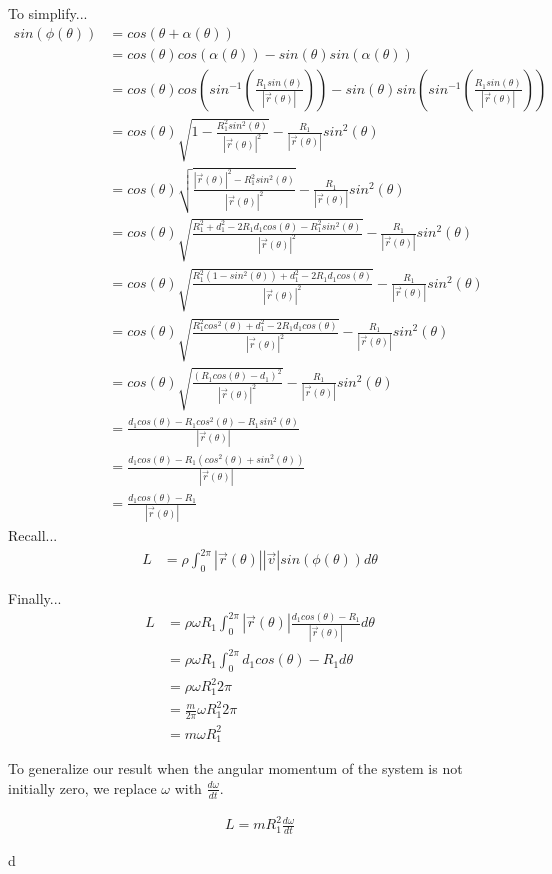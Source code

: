 \documentclass{article}
\begin{document}
	To simplify...
	\begin{align}
		sin(\phi(\theta)) &= cos(\theta + \alpha(\theta)) \\
		 &= cos(\theta)cos(\alpha(\theta)) - sin(\theta)sin(\alpha(\theta)) \\
		 &= cos(\theta)cos(sin^{-1}(\frac{R_1sin(\theta)}{|\vec{r}(\theta)|})) - sin(\theta)sin(sin^{-1}(\frac{R_1sin(\theta)}{|\vec{r}(\theta)|})) \\
		 &= cos(\theta)\sqrt{1-\frac{R_1^2sin^2(\theta)}{|\vec{r}(\theta)|^2}} - \frac{R_1}{|\vec{r}(\theta)|}sin^2(\theta) \\
		 &= cos(\theta)\sqrt{\frac{|\vec{r}(\theta)|^2 - R_1^2sin^2(\theta)}{|\vec{r}(\theta)|^2}} - \frac{R_1}{|\vec{r}(\theta)|}sin^2(\theta) \\
		 &= cos(\theta)\sqrt{\frac{R_1^2+d_1^2-2R_1d_1cos(\theta)- R_1^2sin^2(\theta)}{|\vec{r}(\theta)|^2}} - \frac{R_1}{|\vec{r}(\theta)|}sin^2(\theta) \\
		 &= cos(\theta)\sqrt{\frac{R_1^2(1-sin^2(\theta))+d_1^2-2R_1d_1cos(\theta)}{|\vec{r}(\theta)|^2}} - \frac{R_1}{|\vec{r}(\theta)|}sin^2(\theta) \\
		 &= cos(\theta)\sqrt{\frac{R_1^2cos^2(\theta)+d_1^2-2R_1d_1cos(\theta)}{|\vec{r}(\theta)|^2}} - \frac{R_1}{|\vec{r}(\theta)|}sin^2(\theta) \\
		 &= cos(\theta)\sqrt{\frac{(R_1cos(\theta) - d_1)^2}{|\vec{r}(\theta)|^2}} - \frac{R_1}{|\vec{r}(\theta)|}sin^2(\theta) \\
		 &= \frac{d_1cos(\theta) - R_1cos^2(\theta) - R_1sin^2(\theta)}{|\vec{r}(\theta)|} \\
		 &= \frac{d_1cos(\theta) - R_1(cos^2(\theta) + sin^2(\theta))}{|\vec{r}(\theta)|} \\
		 &= \frac{d_1cos(\theta) - R_1}{|\vec{r}(\theta)|}
	\end{align}
	Recall...
	\begin{align}
		L &= \rho\int_0^{2\pi}|\vec{r}(\theta)||\vec{v}|sin(\phi(\theta))d\theta
	\end{align}

	Finally...
	\begin{align}
		L &=\rho\omega R_1\int_0^{2\pi}|\vec{r}(\theta)|\frac{d_1cos(\theta) - R_1}{|\vec{r}(\theta)|}d\theta \\
		 &= \rho\omega R_1\int_0^{2\pi}d_1cos(\theta) - R_1 d\theta \\
		 &= \rho\omega R_1^2 2\pi \\
		 &= \frac{m}{2\pi} \omega R_1^2 2\pi  \\
		 &= m \omega R_1^2
	\end{align}

	To generalize our result when the angular momentum of the system is not initially zero,
	we replace $\omega$ with $\frac{d\omega}{dt}$.

	\begin{align}
		L = mR_1^2\frac{d\omega}{dt}
	\end{align}

	d
	
\end{document}
